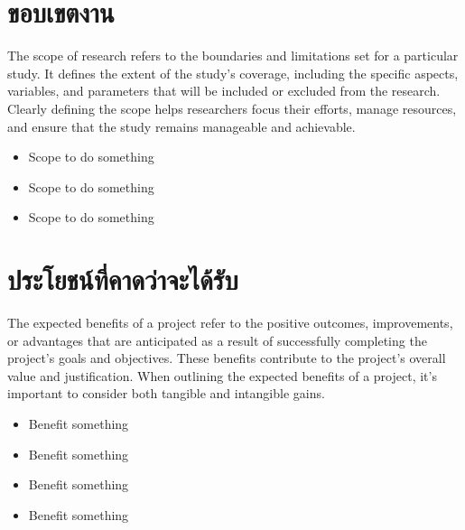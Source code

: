 \section{ขอบเขตงาน}
\label{Sec:ScopeOfWork}
The scope of research refers to the boundaries and limitations set for a particular study. It defines the extent of the study's coverage, including the specific aspects, variables, and parameters that will be included or excluded from the research. Clearly defining the scope helps researchers focus their efforts, manage resources, and ensure that the study remains manageable and achievable. 
\begin{itemize}
    \item Scope to do something
    \item Scope to do something
    \item Scope to do something
\end{itemize}

\section{ประโยชน์ที่คาดว่าจะได้รับ}
\label{Sec:ExpectedBenefit}
The expected benefits of a project refer to the positive outcomes, improvements, or advantages that are anticipated as a result of successfully completing the project's goals and objectives. These benefits contribute to the project's overall value and justification. When outlining the expected benefits of a project, it's important to consider both tangible and intangible gains. 
\begin{itemize}
    \item Benefit something 
    \item Benefit something
    \item Benefit something
    \item Benefit something
\end{itemize}

